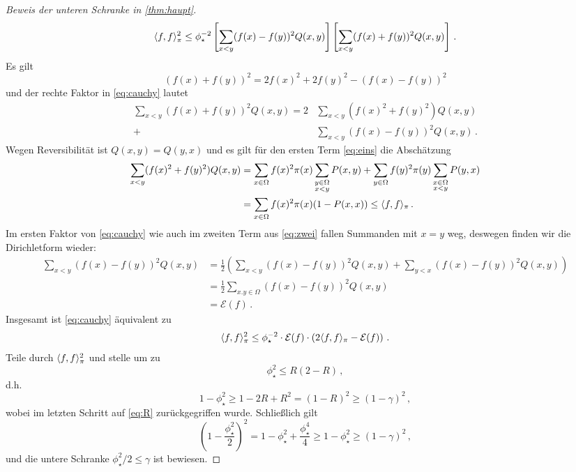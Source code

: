 \documentclass[ngerman,a4paper,11pt]{scrartcl}
\newcommand{\diri}{\mathcal{E}}
\DeclarePairedDelimiter{\sprod}{\langle}{\rangle}	%
\begin{document}
\begin{proof}[Beweis der unteren Schranke in \cref{thm:haupt}]
\begin{equation}
  \label{eq:cauchy}
  \sprod{f,f}_\pi^2\leq\phi_\star^{-2}\left[ \sum_{x<y}(f(x)-f(y))^2Q(x,y) \right]\left[ \sum_{x<y}(f(x)+f(y))^2Q(x,y) \right]\, .
 \end{equation}
 Es gilt
 \begin{equation*}
  (f(x)+f(y))^2=2f(x)^2+2f(y)^2-(f(x)-f(y))^2 
 \end{equation*}
 und der rechte Faktor in \cref{eq:cauchy} lautet
 \begin{align}
  \sum_{x<y}(f(x)+f(y))^2Q(x,y)=2&\sum_{x<y}(f(x)^2+f(y)^2)Q(x,y) \label{eq:eins} \\
  +&\sum_{x<y}(f(x)-f(y))^2Q(x,y)\, . \label{eq:zwei}
 \end{align}
 Wegen Reversibilität ist $Q(x,y)=Q(y,x)$ und es gilt für den ersten Term
 \eqref{eq:eins} die Abschätzung
 \begin{align*}
  \sum_{x<y}(f(x)^2+f(y)^2)Q(x,y)&=\sum_{x\in\Omega}f(x)^2\pi(x)\sum_{\substack{y\in\Omega\\x<y}}P(x,y)+\sum_{y\in\Omega}f(y)^2\pi(y)\sum_{\substack{x\in\Omega\\x<y}}P(y,x) \\
  &=\sum_{x\in\Omega}f(x)^2\pi(x)(1-P(x,x))\leq\sprod{f,f}_\pi \, .
 \end{align*}
 Im ersten Faktor von \cref{eq:cauchy} wie auch im zweiten Term aus
 \cref{eq:zwei} fallen Summanden mit $x=y$ weg, deswegen finden wir die
 Dirichletform wieder:
 \begin{align*}
  \sum_{x<y}(f(x)-f(y))^2Q(x,y)&=\frac{1}{2}\left( \sum_{x<y}(f(x)-f(y))^2Q(x,y)+\sum_{y<x}(f(x)-f(y))^2Q(x,y)\right)\\
  &=\frac{1}{2}\sum_{x.y\in\Omega}(f(x)-f(y))^2Q(x,y) \\
  &=\diri(f)\, .
 \end{align*}
 Insgesamt ist \cref{eq:cauchy} äquivalent zu
 \begin{equation*}
  \sprod{f,f}_\pi^2\leq\phi_\star^{-2}\cdot\diri(f)\cdot \left(2\sprod{f,f}_\pi-\diri(f)\right) \, .
 \end{equation*}
 Teile durch $\sprod{f,f}_\pi^2$ und stelle um zu
 \begin{equation*}
  \phi_\star^2\leq R(2-R)\, ,
 \end{equation*}
 d.h.
 \begin{equation*}
  1-\phi_\star^2\geq1-2R+R^2=(1-R)^2\geq(1-\gamma)^2\, , 
 \end{equation*}
 wobei im letzten Schritt auf \cref{eq:R} zurückgegriffen wurde. Schließlich gilt
 \begin{equation*}
  \left( 1-\frac{\phi_\star^2}{2} \right)^2=1-\phi_\star^2+\frac{\phi_\star^4}{4}\geq 1-\phi_\star^2\geq (1-\gamma)^2\, , 
 \end{equation*}
 und die untere Schranke $\phi_\star^2/2\leq\gamma$ ist bewiesen.
\end{proof}
\printbibliography
\end{document}
